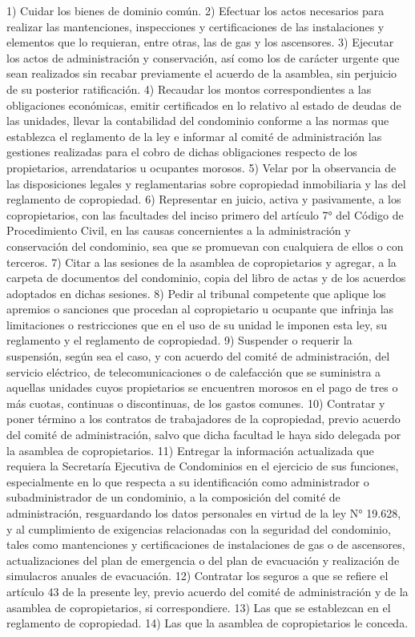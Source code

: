     1) Cuidar los bienes de dominio común.
    2) Efectuar los actos necesarios para realizar las mantenciones, inspecciones y certificaciones de las instalaciones y elementos que lo requieran, entre otras, las de gas y los ascensores.
    3) Ejecutar los actos de administración y conservación, así como los de carácter urgente que sean realizados sin recabar previamente el acuerdo de la asamblea, sin perjuicio de su posterior ratificación.
    4) Recaudar los montos correspondientes a las obligaciones económicas, emitir certificados en lo relativo al estado de deudas de las unidades, llevar la contabilidad del condominio conforme a las normas que establezca el reglamento de la ley e informar al comité de administración las gestiones realizadas para el cobro de dichas obligaciones respecto de los propietarios, arrendatarios u ocupantes morosos.
    5) Velar por la observancia de las disposiciones legales y reglamentarias sobre copropiedad inmobiliaria y las del reglamento de copropiedad.
    6) Representar en juicio, activa y pasivamente, a los copropietarios, con las facultades del inciso primero del artículo 7° del Código de Procedimiento Civil, en las causas concernientes a la administración y conservación del condominio, sea que se promuevan con cualquiera de ellos o con terceros.
    7) Citar a las sesiones de la asamblea de copropietarios y agregar, a la carpeta de documentos del condominio, copia del libro de actas y de los acuerdos adoptados en dichas sesiones.
    8) Pedir al tribunal competente que aplique los apremios o sanciones que procedan al copropietario u ocupante que infrinja las limitaciones o restricciones que en el uso de su unidad le imponen esta ley, su reglamento y el reglamento de copropiedad.
    9) Suspender o requerir la suspensión, según sea el caso, y con acuerdo del comité de administración, del servicio eléctrico, de telecomunicaciones o de calefacción que se suministra a aquellas unidades cuyos propietarios se encuentren morosos en el pago de tres o más cuotas, continuas o discontinuas, de los gastos comunes.
    10) Contratar y poner término a los contratos de trabajadores de la copropiedad, previo acuerdo del comité de administración, salvo que dicha facultad le haya sido delegada por la asamblea de copropietarios.
    11) Entregar la información actualizada que requiera la Secretaría Ejecutiva de Condominios en el ejercicio de sus funciones, especialmente en lo que respecta a su identificación como administrador o subadministrador de un condominio, a la composición del comité de administración, resguardando los datos personales en virtud de la ley N° 19.628, y al cumplimiento de exigencias relacionadas con la seguridad del condominio, tales como mantenciones y certificaciones de instalaciones de gas o de ascensores, actualizaciones del plan de emergencia o del plan de evacuación y realización de simulacros anuales de evacuación.
    12) Contratar los seguros a que se refiere el artículo 43 de la presente ley, previo acuerdo del comité de administración y de la asamblea de copropietarios, si correspondiere.
    13) Las que se establezcan en el reglamento de copropiedad.
    14) Las que la asamblea de copropietarios le conceda.
     

